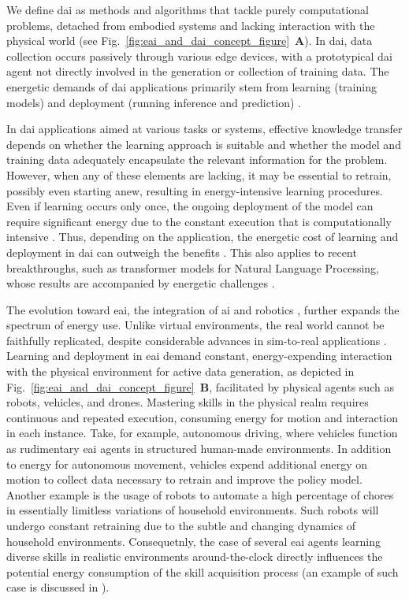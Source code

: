 \documentclass[12pt]{article}
\begin{document}
We define \ac{dai} as methods and algorithms that tackle purely computational problems, detached from embodied systems and lacking interaction with the physical world (see Fig.~\ref{fig:eai_and_dai_concept_figure}~\textbf{A}). In \ac{dai}, data collection occurs passively through various edge devices, with a prototypical \ac{dai} agent not directly involved in the generation or collection of training data. The energetic demands of \ac{dai} applications primarily stem from learning (training models) and deployment (running inference and prediction) \cite{Vries2023growingenergyfootprint}.

In \ac{dai} applications aimed at various tasks or systems, effective knowledge transfer depends on whether the learning approach is suitable and whether the model and training data adequately encapsulate the relevant information for the problem. However, when any of these elements are lacking, it may be essential to retrain, possibly even starting anew, resulting in energy-intensive learning procedures. Even if learning occurs only once, the ongoing deployment of the model can require significant energy due to the constant execution that is computationally intensive \cite{Vries2023growingenergyfootprint}. Thus, depending on the application, the energetic cost of learning and deployment in \ac{dai} can outweigh the benefits \cite{Strubell2019EnergyPolicyConsiderations}. This also applies to recent breakthroughs, such as transformer models for Natural Language Processing, whose results are accompanied by energetic challenges \cite{Cao2020TowardsAccurateReliable}.

The evolution toward \ac{eai}, the integration of \ac{ai} and robotics \cite{Pfeifer2004Embodiedartificialintelligence}, further expands the spectrum of energy use. Unlike virtual environments, the real world cannot be faithfully replicated, despite considerable advances in sim-to-real applications \cite{Chebotar2019Closingsimreal}. Learning and deployment in \ac{eai} demand constant, energy-expending interaction with the physical environment for active data generation, as depicted in Fig.~\ref{fig:eai_and_dai_concept_figure}~\textbf{B}, facilitated by physical agents such as robots, vehicles, and drones. Mastering skills in the physical realm requires continuous and repeated execution, consuming energy for motion and interaction in each instance. Take, for example, autonomous driving, where vehicles function as rudimentary \ac{eai} agents in structured human-made environments. In addition to energy for autonomous movement, vehicles expend additional energy on motion to collect data necessary to retrain and improve the policy model. Another example is the usage of robots to automate a high percentage of chores in essentially limitless variations of household environments\cite{Lehdonvirta2022futuresunpaidwork}. Such robots will undergo constant retraining due to the subtle and changing dynamics of household environments. Consequetnly, the case of several \ac{eai} agents learning diverse skills in realistic environments around-the-clock directly influences the potential energy consumption of the skill acquisition process (an example of such case is discussed in \cite{Johannsmeier2025APM}).
\end{document}
